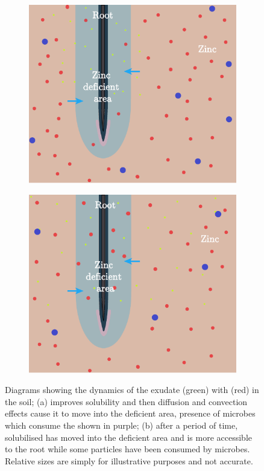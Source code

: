 \documentclass[11pt]{article}
\numberwithin{equation}{section}
\begin{document}
\begin{figure}[h]
\centering
\begin{subfigure}[t]{0.35\textwidth}
    \includegraphics[width=\textwidth]{Figures/RootZincDiagram.pdf}
    \caption{}
\end{subfigure}
\qquad
\begin{subfigure}[t]{0.35\textwidth}
    \includegraphics[width=\textwidth]{Figures/RootZincDiagram2.pdf}
    \caption{}
\end{subfigure}
\caption{Diagrams showing the dynamics of the exudate  (green) with  (red) in the soil; (a)  improves  solubility and then diffusion and convection effects cause it to move into the deficient area, presence of microbes which consume the  shown in purple; (b) after a period of time, solubilised  has moved into the deficient area and is more accessible to the root while some  particles have been consumed by microbes. Relative sizes are simply for illustrative purposes and not accurate.}
\label{fig:Zinc}
\end{figure}
\end{document}
